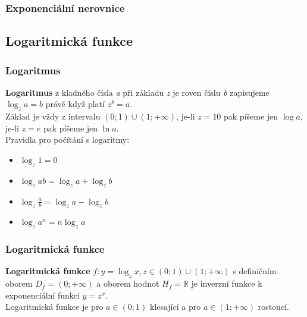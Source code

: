 \documentclass[12pt, a4paper]{article}
\begin{document}
\subsubsection*{Exponenciální nerovnice}

\subsection*{Logaritmická funkce}
\subsubsection*{Logaritmus}
\textbf{Logaritmus} z kladného čísla \textit{a} při základu \textit{z} je roven číslu \textit{b} zapisujeme $\log_z a = b$ právě když platí $z^b=a$.\\
Základ je vždy z intervalu $(0;1) \cup (1;+\infty)$, je-li $z=10$ pak píšeme jen $\log a$, je-li $z=e$ pak píšeme jen $\ln a$.\\

Pravidla pro počítání s logaritmy:
\begin{itemize}
\item $\log_z 1 = 0$
\item $\log_z ab = \log_z a + \log_z b$
\item $\log_z \frac{a}{b} = \log_z a - \log_z b$
\item $\log_z a^n = n \log_z a$
\end{itemize}

\subsubsection*{Logaritmická funkce}
\textbf{Logaritmická funkce} $f: y = \log_z x, z \in (0;1) \cup (1;+\infty)$ s definičním oborem $D_f = (0;+\infty)$ a oborem hodnot $H_f = \mathbb{R}$ je inverzní 
funkce k exponenciální funkci $y=z^x$.\\
Logaritmická funkce je pro $a \in (0;1)$ klesající a pro $a \in (1;+\infty)$ rostoucí.
\end{document}
